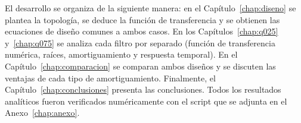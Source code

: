 El desarrollo se organiza de la siguiente manera: en el Capítulo~\ref{chap:diseno} se plantea la topología,
se deduce la función de transferencia y se obtienen las ecuaciones de diseño comunes a ambos casos. En los
Capítulos~\ref{chap:q025} y~\ref{chap:q075} se analiza cada filtro por separado (función de transferencia
numérica, raíces, amortiguamiento y respuesta temporal). En el Capítulo~\ref{chap:comparacion} se comparan
ambos diseños y se discuten las ventajas de cada tipo de amortiguamiento. Finalmente, el
Capítulo~\ref{chap:conclusiones} presenta las conclusiones. Todos los resultados analíticos fueron
verificados numéricamente con el script que se adjunta en el Anexo~\ref{chap:anexo}.
